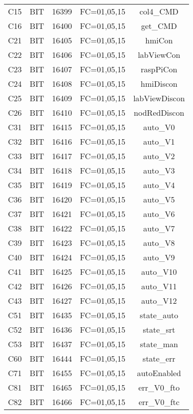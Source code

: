 \begin{center}
\begin{longtable}[c]{ |c|c|c|c|c| }
        C15	&	BIT	&	16399	&	FC=01,05,15	&	col4\_CMD\\
        C16	&	BIT	&	16400	&	FC=01,05,15	&	get\_CMD\\
        C21	&	BIT	&	16405	&	FC=01,05,15	&	hmiCon\\
        C22	&	BIT	&	16406	&	FC=01,05,15	&	labViewCon\\
        C23	&	BIT	&	16407	&	FC=01,05,15	&	raspPiCon\\
        C24	&	BIT	&	16408	&	FC=01,05,15	&	hmiDiscon\\
        C25	&	BIT	&	16409	&	FC=01,05,15	&	labViewDiscon\\
        C26	&	BIT	&	16410	&	FC=01,05,15	&	nodRedDiscon\\
        C31	&	BIT	&	16415	&	FC=01,05,15	&	auto\_V0\\
        C32	&	BIT	&	16416	&	FC=01,05,15	&	auto\_V1\\
        C33	&	BIT	&	16417	&	FC=01,05,15	&	auto\_V2\\
        C34	&	BIT	&	16418	&	FC=01,05,15	&	auto\_V3\\
        C35	&	BIT	&	16419	&	FC=01,05,15	&	auto\_V4\\
        C36	&	BIT	&	16420	&	FC=01,05,15	&	auto\_V5\\
        C37	&	BIT	&	16421	&	FC=01,05,15	&	auto\_V6\\
        C38	&	BIT	&	16422	&	FC=01,05,15	&	auto\_V7\\
        C39	&	BIT	&	16423	&	FC=01,05,15	&	auto\_V8\\
        C40	&	BIT	&	16424	&	FC=01,05,15	&	auto\_V9\\
        C41	&	BIT	&	16425	&	FC=01,05,15	&	auto\_V10\\
        C42	&	BIT	&	16426	&	FC=01,05,15	&	auto\_V11\\
        C43	&	BIT	&	16427	&	FC=01,05,15	&	auto\_V12\\
        C51	&	BIT	&	16435	&	FC=01,05,15	&	state\_auto\\
        C52	&	BIT	&	16436	&	FC=01,05,15	&	state\_srt\\
        C53	&	BIT	&	16437	&	FC=01,05,15	&	state\_man\\
        C60	&	BIT	&	16444	&	FC=01,05,15	&	state\_err\\
        C71	&	BIT	&	16455	&	FC=01,05,15	&	autoEnabled\\
        C81	&	BIT	&	16465	&	FC=01,05,15	&	err\_V0\_fto\\
        C82	&	BIT	&	16466	&	FC=01,05,15	&	err\_V0\_ftc\\

\end{longtable}
\end{center}
